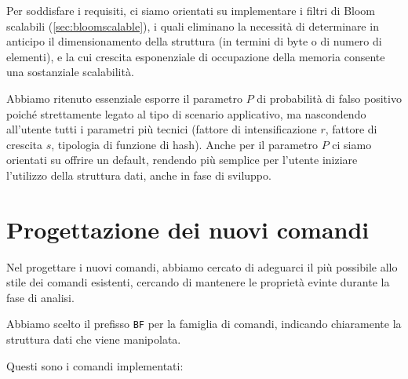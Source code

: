 Per soddisfare i requisiti, ci siamo orientati su implementare i filtri di Bloom
scalabili (\autoref{sec:bloomscalable}), i quali eliminano la necessità di determinare in anticipo il
dimensionamento della struttura (in termini di byte o di numero di elementi), e la cui crescita
esponenziale di occupazione della memoria consente una sostanziale scalabilità.

Abbiamo ritenuto essenziale esporre il parametro $P$ di probabilità di falso positivo poiché
strettamente legato al tipo di scenario applicativo, ma nascondendo all'utente tutti i parametri più
tecnici (fattore di intensificazione $r$, fattore di crescita $s$, tipologia di funzione di hash).
Anche per il parametro $P$ ci siamo orientati su offrire un default, rendendo più semplice per
l'utente iniziare l'utilizzo della struttura dati, anche in fase di sviluppo.

\section{Progettazione dei nuovi comandi}

Nel progettare i nuovi comandi, abbiamo cercato di adeguarci il più possibile allo stile dei
comandi esistenti, cercando di mantenere le proprietà evinte durante la fase di analisi.

Abbiamo scelto il prefisso \verb|BF| per la famiglia di comandi, indicando chiaramente la
struttura dati che viene manipolata.

Questi sono i comandi implementati:

